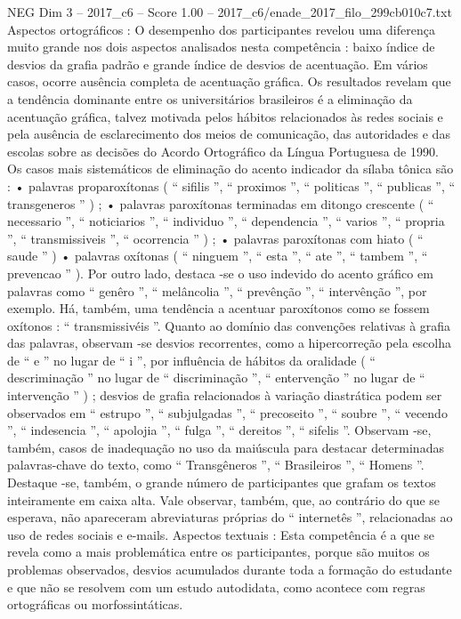 \begin{textsample}{NEG Dim 3 – 2017\_c6 – Score 1.00 – 2017\_c6/enade\_2017\_filo\_299cb010c7.txt}
Aspectos ortográficos : O desempenho dos participantes revelou uma diferença muito grande nos dois aspectos analisados nesta competência : baixo índice de desvios da grafia padrão e grande índice de desvios de acentuação.
Em vários casos, ocorre ausência completa de acentuação gráfica.
Os resultados revelam que a tendência dominante entre os universitários brasileiros é a eliminação da acentuação gráfica, talvez motivada pelos hábitos relacionados às redes sociais e pela ausência de esclarecimento dos meios de comunicação, das autoridades e das escolas sobre as decisões do Acordo Ortográfico da Língua Portuguesa de 1990.
Os casos mais sistemáticos de eliminação do acento indicador da sílaba tônica são : • palavras proparoxítonas ( “ sifilis ”, “ proximos ”, “ politicas ”, “ publicas ”, “ transgeneros ” ) ; • palavras paroxítonas terminadas em ditongo crescente ( “ necessario ”, “ noticiarios ”, “ individuo ”, “ dependencia ”, “ varios ”, “ propria ”, “ transmissiveis ”, “ ocorrencia ” ) ; • palavras paroxítonas com hiato ( “ saude ” ) • palavras oxítonas ( “ ninguem ”, “ esta ”, “ ate ”, “ tambem ”, “ prevencao ” ).
Por outro lado, destaca -se o uso indevido do acento gráfico em palavras como “ genêro ”, “ melâncolia ”, “ prevênção ”, “ intervênção ”, por exemplo.
Há, também, uma tendência a acentuar paroxítonos como se fossem oxítonos : “ transmissivéis ”.
Quanto ao domínio das convenções relativas à grafia das palavras, observam -se desvios recorrentes, como a hipercorreção pela escolha de “ e ” no lugar de “ i ”, por influência de hábitos da oralidade ( “ descriminação ” no lugar de “ discriminação ”, “ entervenção ” no lugar de “ intervenção ” ) ; desvios de grafia relacionados à variação diastrática podem ser observados em “ estrupo ”, “ subjulgadas ”, “ precoseito ”, “ soubre ”, “ vecendo ”, “ indesencia ”, “ apolojia ”, “ fulga ”, “ dereitos ”, “ sifelis ”.
Observam -se, também, casos de inadequação no uso da maiúscula para destacar determinadas palavras-chave do texto, como “ Transgêneros ”, “ Brasileiros ”, “ Homens ”.
Destaque -se, também, o grande número de participantes que grafam os textos inteiramente em caixa alta.
Vale observar, também, que, ao contrário do que se esperava, não apareceram abreviaturas próprias do “ internetês ”, relacionadas ao uso de redes sociais e e-mails.
Aspectos textuais : Esta competência é a que se revela como a mais problemática entre os participantes, porque são muitos os problemas observados, desvios acumulados durante toda a formação do estudante e que não se resolvem com um estudo autodidata, como acontece com regras ortográficas ou morfossintáticas.

\end{textsample}
